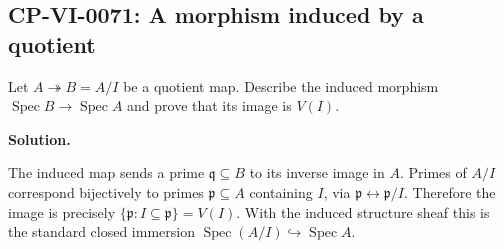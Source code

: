 
\subsection*{CP-VI-0071: A morphism induced by a quotient}

Let $A\twoheadrightarrow B=A/I$ be a quotient map. Describe the induced morphism $\operatorname{Spec}B\to\operatorname{Spec}A$ and prove that its image is $V(I)$.

\medskip
\noindent\textbf{Solution.}

The induced map sends a prime $\mathfrak q\subseteq B$ to its inverse image in $A$. Primes of $A/I$ correspond bijectively to primes $\mathfrak p\subseteq A$ containing $I$, via $\mathfrak p\leftrightarrow\mathfrak p/I$. Therefore the image is precisely $\{\mathfrak p:I\subseteq\mathfrak p\}=V(I)$. With the induced structure sheaf this is the standard closed immersion $\operatorname{Spec}(A/I)\hookrightarrow\operatorname{Spec}A$.
